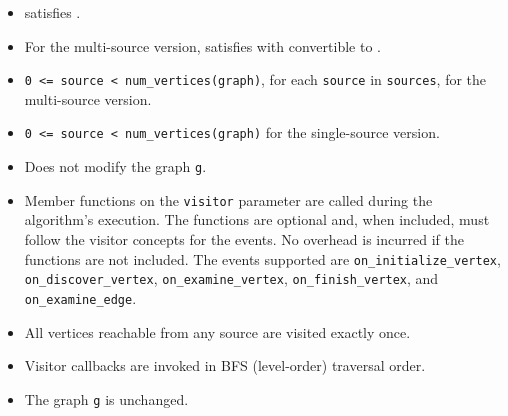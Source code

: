 \begin{itemdescr}
      \pnum\mandates
            \begin{itemize}
                  \item {} satisfies .
                  \item For the multi-source version,  satisfies 
                        with  convertible to .
            \end{itemize}
      \pnum\preconditions
            \begin{itemize}
                  \item
                        \lstinline{0 <= source < num_vertices(graph)}, for each \lstinline{source} in \lstinline{sources},
                                   for the multi-source version.
            \end{itemize}
      \pnum\hardprecond
            \begin{itemize}
                  \item
                        \lstinline{0 <= source < num_vertices(graph)} for the single-source version.
            \end{itemize}
      \pnum\effects
            \begin{itemize}
                  \item Does not modify the graph \lstinline{g}.
                  \item Member functions on the \lstinline{visitor} parameter are called during the algorithm's execution.
                        The functions are optional and, when included, must follow the visitor concepts for the events.
                        No overhead is incurred if the functions are not included.
                        The events supported are \lstinline{on_initialize_vertex}, \lstinline{on_discover_vertex},
                        \lstinline{on_examine_vertex}, \lstinline{on_finish_vertex}, and \lstinline{on_examine_edge}.
            \end{itemize}
      \pnum\postconditions
            \begin{itemize}
                  \item All vertices reachable from any source are visited exactly once.
                  \item Visitor callbacks are invoked in BFS (level-order) traversal order.
                  \item The graph \lstinline{g} is unchanged.

\end{itemize}
\end{itemdescr}
